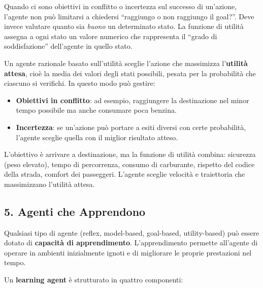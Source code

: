 Quando ci sono obiettivi in conflitto o incertezza sul successo di un'azione, l'agente non può limitarsi a chiedersi ``raggiungo o non raggiungo il goal?''. Deve invece valutare quanto sia \emph{buono} un determinato stato. La funzione di utilità assegna a ogni stato un valore numerico che rappresenta il ``grado di soddisfazione'' dell'agente in quello stato.

Un agente razionale basato sull'utilità sceglie l'azione che massimizza l'\textbf{utilità attesa}, cioè la media dei valori degli stati possibili, pesata per la probabilità che ciascuno si verifichi. In questo modo può gestire:
\begin{itemize}
    \item \textbf{Obiettivi in conflitto}: ad esempio, raggiungere la destinazione nel minor tempo possibile ma anche consumare poca benzina.
    \item \textbf{Incertezza}: se un'azione può portare a esiti diversi con certe probabilità, l'agente sceglie quella con il miglior risultato atteso.
\end{itemize}

\begin{exbox}
L'obiettivo è arrivare a destinazione, ma la funzione di utilità combina: sicurezza (peso elevato), tempo di percorrenza, consumo di carburante, rispetto del codice della strada, comfort dei passeggeri. L'agente sceglie velocità e traiettoria che massimizzano l'utilità attesa.
\end{exbox}

\subsection{5. Agenti che Apprendono}
Qualsiasi tipo di agente (reflex, model-based, goal-based, utility-based) può essere dotato di \textbf{capacità di apprendimento}. L'apprendimento permette all'agente di operare in ambienti inizialmente ignoti e di migliorare le proprie prestazioni nel tempo.

Un \textbf{learning agent} è strutturato in quattro componenti:



